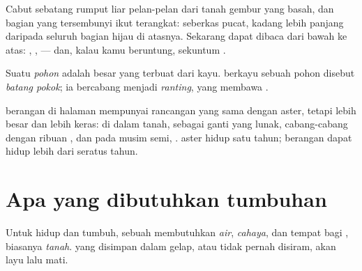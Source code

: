 \begin{example}\label{ex:g1:plants-around-us:weed}
Cabut sebatang rumput liar pelan-pelan dari tanah gembur yang basah,
dan bagian yang tersembunyi ikut terangkat: seberkas  pucat,
kadang lebih panjang daripada seluruh bagian hijau di atasnya.
Sekarang  dapat dibaca dari bawah ke atas: , ,
 --- dan, kalau kamu beruntung, sekuntum .
\end{example}

\begin{definition}[Pohon]\label{def:g1:plants-around-us:tree}
Suatu \emph{pohon} adalah  besar yang 
terbuat dari kayu.  berkayu sebuah pohon disebut
\emph{batang pokok}; ia bercabang menjadi
\emph{ranting}, yang membawa .
\end{definition}

\begin{example}\label{ex:g1:plants-around-us:tree}
 berangan di halaman mempunyai rancangan yang sama dengan 
aster, tetapi lebih besar dan lebih keras:  di dalam tanah,  sebagai ganti  yang lunak, cabang-cabang dengan ribuan
, dan pada musim semi, .  aster hidup satu tahun; 
berangan dapat hidup lebih dari seratus tahun.
\end{example}

\section{Apa yang dibutuhkan tumbuhan}

\begin{proposition}\label{prop:g1:plants-around-us:needs}
Untuk hidup dan tumbuh, sebuah  membutuhkan \emph{air},
\emph{cahaya}, dan tempat bagi , biasanya
\emph{tanah}.  yang disimpan dalam gelap, atau
tidak pernah disiram, akan layu lalu mati.
\end{proposition}
\admitted

